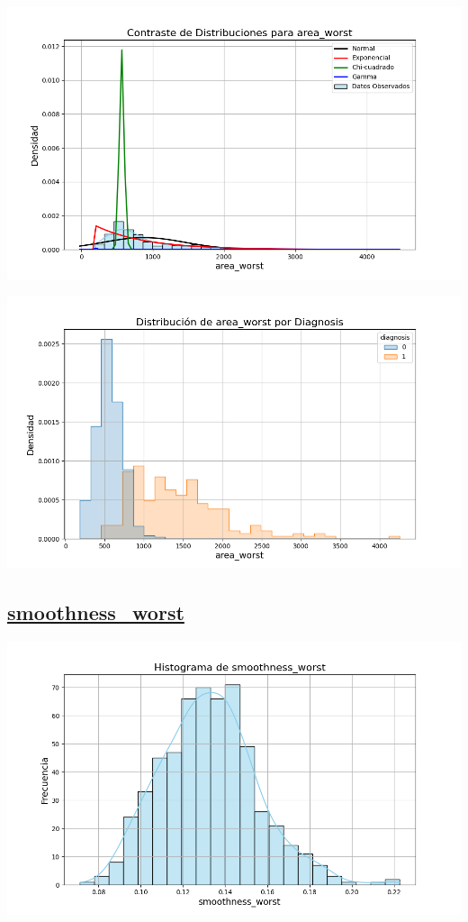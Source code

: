 \documentclass[a4paper, 12pt]{article}
\begin{document}
\includegraphics[width=\textwidth]{../Plots/plots_stats/area_worst/distribuciones_conocidas_area_worst.png}

\includegraphics[width=\textwidth]{../Plots/plots_diagnosis/distribucion_area_worst_por_diagnosis.png}

\subsection*{\underline{smoothness\_worst}}

	\includegraphics[width=\textwidth]{../Plots/plots_stats/smoothness_worst/histograma_smoothness_worst.png}
\end{document}
